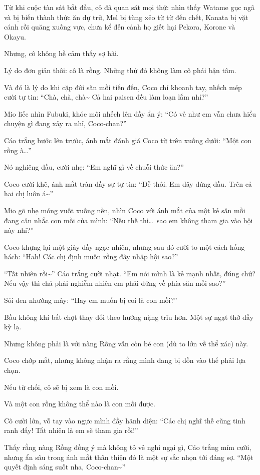 \documentclass[../main.tex]{subfiles}
\begin{document}
Từ khi cuộc tàn sát bắt đầu, cô đã quan sát mọi thứ: nhìn thấy Watame gục ngã và bị biến thành thức ăn dự trữ, Mel bị tùng xẻo từ từ đến chết, Kanata bị vặt cánh rồi quăng xuống vực, chưa kể đến cảnh họ giết hại Pekora, Korone và Okayu.

Nhưng, cô không hề cảm thấy sợ hãi.

Lý do đơn giản thôi: cô là rồng. Những thứ đó không làm cô phải bận tâm.

Và đó là lý do khi cặp đôi săn mồi tiến đến, Coco chỉ khoanh tay, nhếch mép cười tự tin: ``Chà, chà, chà\~{} Cả hai paisen đều làm loạn lắm nhỉ?''

Mio liếc nhìn Fubuki, khóe môi nhếch lên đầy ẩn ý: ``Có vẻ như em vẫn chưa hiểu chuyện gì đang xảy ra nhỉ, Coco-chan?''

Cáo trắng bước lên trước, ánh mắt đánh giá Coco từ trên xuống dưới: ``Một con rồng à\dots''

Nó nghiêng đầu, cười nhẹ: ``Em nghĩ gì về chuỗi thức ăn?''

Coco cười khẽ, ánh mắt tràn đầy sự tự tin: ``Dễ thôi. Em đây đứng đầu. Trên cả hai chị luôn á\~{}''

Mio gõ nhẹ móng vuốt xuống nền, nhìn Coco với ánh mắt của một kẻ săn mồi đang cân nhắc con mồi của mình: ``Nếu thế thì\dots\ sao em không tham gia vào hội này nhỉ?''

Coco khựng lại một giây đầy ngạc nhiên, nhưng sau đó cười to một cách hống hách: ``Hah! Các chị định muốn rồng đây nhập hội sao?''

``Tất nhiên rồi\~{}'' Cáo trắng cười nhạt. ``Em nói mình là kẻ mạnh nhất, đúng chứ? Nếu vậy thì chả phải nghiễm nhiên em phải đứng về phía săn mồi sao?''

Sói đen nhướng mày: ``Hay em muốn bị coi là con mồi?''

Bầu không khí bất chợt thay đổi theo hướng nặng trĩu hơn. Một sự ngạt thở đầy kỳ lạ.

Nhưng không phải là với nàng Rồng vẫn còn bé con (dù to lớn về thể xác) này.

Coco chớp mắt, nhưng không nhận ra rằng mình đang bị dồn vào thế phải lựa chọn.

Nếu từ chối, cô sẽ bị xem là con mồi.

Và một con rồng không thể nào là con mồi được.

Cô cười lớn, vỗ tay vào ngực mình đầy hãnh diện: ``Các chị nghĩ thế cũng tinh ranh đấy! Tất nhiên là em sẽ tham gia rồi!''

Thấy rằng nàng Rồng đồng ý mà không tỏ vẻ nghi ngại gì, Cáo trắng mỉm cười, nhưng ẩn sâu trong ánh mắt thân thiện đó là một sự sắc nhọn tới đáng sợ. ``Một quyết định sáng suốt nha, Coco-chan\~{}''
\end{document}
